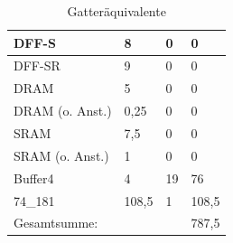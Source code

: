 \documentclass[11pt]{report}
\begin{document}
\begin{table}[h]
\begin{tabular}{llll}
			\multicolumn{1}{|l|}{DFF-S}                  & \multicolumn{1}{l|}{8}     & \multicolumn{1}{l|}{0}  & \multicolumn{1}{l|}{0}     \\ \hline
			\multicolumn{1}{|l|}{DFF-SR}                 & \multicolumn{1}{l|}{9}     & \multicolumn{1}{l|}{0}  & \multicolumn{1}{l|}{0}     \\ \hline
			\multicolumn{1}{|l|}{DRAM}                   & \multicolumn{1}{l|}{5}     & \multicolumn{1}{l|}{0}  & \multicolumn{1}{l|}{0}     \\ \hline
			\multicolumn{1}{|l|}{DRAM (o. Anst.)}        & \multicolumn{1}{l|}{0,25}  & \multicolumn{1}{l|}{0}  & \multicolumn{1}{l|}{0}     \\ \hline
			\multicolumn{1}{|l|}{SRAM}                   & \multicolumn{1}{l|}{7,5}   & \multicolumn{1}{l|}{0}  & \multicolumn{1}{l|}{0}     \\ \hline
			\multicolumn{1}{|l|}{SRAM (o. Anst.)}        & \multicolumn{1}{l|}{1}     & \multicolumn{1}{l|}{0}  & \multicolumn{1}{l|}{0}     \\ \hline
			\multicolumn{1}{|l|}{Buffer4}                & \multicolumn{1}{l|}{4}     & \multicolumn{1}{l|}{19} & \multicolumn{1}{l|}{76}    \\ \hline
			\multicolumn{1}{|l|}{74\_181}                & \multicolumn{1}{l|}{108,5} & \multicolumn{1}{l|}{1}  & \multicolumn{1}{l|}{108,5} \\ \hline\hline
			Gesamtsumme:                                 &                            &                         & 787,5                      \\ \hline
		\end{tabular}
		\caption{Gatteräquivalente}\label{gatecount}
	\end{table}
	\FloatBarrier
	
\end{document}
